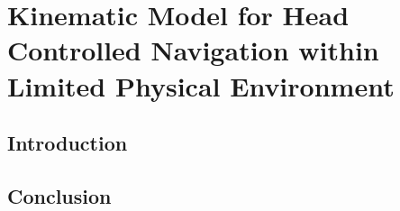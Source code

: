\chapter{Kinematic Model for Head Controlled Navigation within Limited Physical Environment}
\label{chapter:kinematics}
\minitoc

\section{Introduction}

\section{Conclusion}
